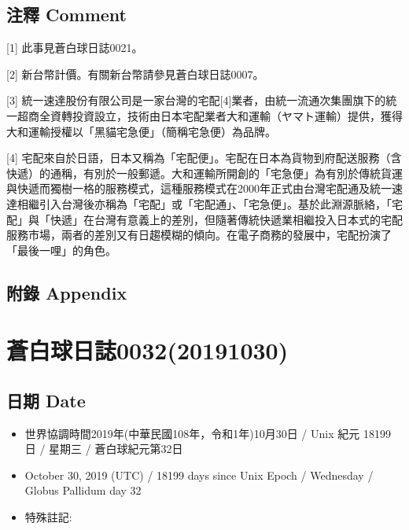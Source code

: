 \documentclass[a5paper, 12pt
]{book}
\providecommand{\tightlist}{%
  \setlength{\itemsep}{0pt}\setlength{\parskip}{0pt}}
\begin{document}
\hypertarget{ux6ce8ux91cb-comment-24}{%
\subsection{注釋 Comment}\label{ux6ce8ux91cb-comment-24}}

{[}1{]} 此事見蒼白球日誌0021。

{[}2{]} 新台幣計價。有關新台幣請參見蒼白球日誌0007。

{[}3{]}
統一速達股份有限公司是一家台灣的宅配{[}4{]}業者，由統一流通次集團旗下的統一超商全資轉投資設立，技術由日本宅配業者大和運輸（ヤマト運輸）提供，獲得大和運輸授權以「黑貓宅急便」（簡稱宅急便）為品牌。

{[}4{]}
宅配來自於日語，日本又稱為「宅配便」。宅配在日本為貨物到府配送服務（含快遞）的通稱，有別於一般郵遞。大和運輸所開創的「宅急便」為有別於傳統貨運與快遞而獨樹一格的服務模式，這種服務模式在2000年正式由台灣宅配通及統一速達相繼引入台灣後亦稱為「宅配」或「宅配通」、「宅急便」。基於此淵源脈絡，「宅配」與「快遞」在台灣有意義上的差別，但隨著傳統快遞業相繼投入日本式的宅配服務市場，兩者的差別又有日趨模糊的傾向。在電子商務的發展中，宅配扮演了「最後一哩」的角色。

\hypertarget{ux9644ux9304-appendix-23}{%
\subsection{附錄 Appendix}\label{ux9644ux9304-appendix-23}}

\hypertarget{ux84bcux767dux7403ux65e5ux8a8c003220191030}{%
\section{蒼白球日誌0032(20191030)}\label{ux84bcux767dux7403ux65e5ux8a8c003220191030}}

\hypertarget{ux65e5ux671f-date-29}{%
\subsection{日期 Date}\label{ux65e5ux671f-date-29}}

\begin{itemize}
\tightlist
\item
  世界協調時間2019年(中華民國108年，令和1年)10月30日 / Unix 紀元 18199
  日 / 星期三 / 蒼白球紀元第32日
\item
  October 30, 2019 (UTC) / 18199 days since Unix Epoch / Wednesday /
  Globus Pallidum day 32
\item
  特殊註記:
\end{itemize}
\end{document}
